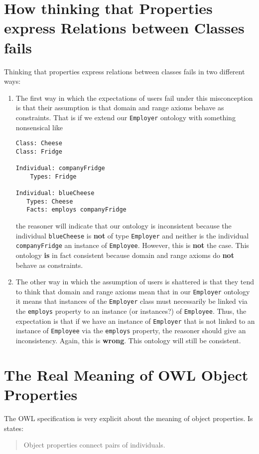 \documentclass{amsart}
\begin{document}
  \section{How thinking that Properties express Relations between Classes fails}
  Thinking that properties express relations between classes fails in two different ways:
\begin{enumerate}
 \item The first way in which the expectations of users fail under this misconception is that their assumption is that domain and range axioms behave as constraints. That is if we extend our \texttt{Employer} ontology with something nonsensical like 
\begin{small}
\begin{verbatim} 
Class: Cheese
Class: Fridge

Individual: companyFridge 
    Types: Fridge
    
Individual: blueCheese
   Types: Cheese
   Facts: employs companyFridge
\end{verbatim}
\end{small} 
the reasoner will indicate that our ontology is inconsistent because the individual \texttt{blueCheese} is \textbf{not} of type \texttt{Employer} and neither is the individual \texttt{companyFridge} an instance of \texttt{Employee}. However, this is \textbf{not} the case. This ontology \textbf{is} in fact consistent because domain and range axioms do \textbf{not} behave as constraints. 

\item The other way in which the assumption of users is shattered is that they tend to think that domain and range axioms mean that in our \texttt{Employer} ontology it means that instances of the \texttt{Employer} class must necessarily be linked via the \texttt{employs} property to an instance (or instances?) of \texttt{Employee}. Thus, the expectation is that if we have an instance of \texttt{Employer} that is not linked to an instance of \texttt{Employee} via the \texttt{employs} property, the reasoner should give an inconsistency. Again, this is \textbf{wrong}. This ontology will still be consistent.
\end{enumerate}

  
   \section{The Real Meaning of OWL Object Properties}
The OWL specification is very explicit about the meaning of object properties. Is states:
\begin{quote}
 Object properties connect pairs of individuals.
\end{quote}
\end{document}
